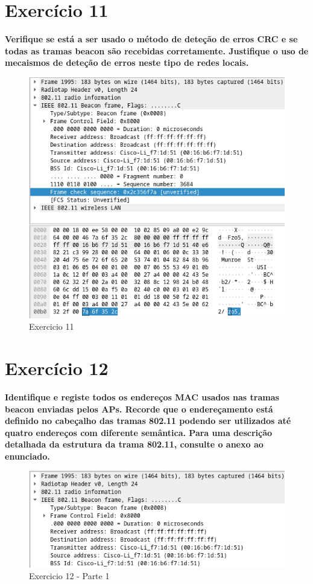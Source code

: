 \documentclass[a4paper]{report}
\begin{document}
\section{Exercício 11}
\textbf{Verifique se está a ser usado o método de deteção de erros CRC e se
    todas as tramas beacon são recebidas corretamente. Justifique o uso de
    mecaismos de deteção de erros neste tipo de redes locais.}

\begin{figure}[H]
    \centering 
    \includegraphics[width=\textwidth]{images/ex11.png}  
    \caption{Exercicio 11}
    \label{fig:ex11}
\end{figure}

\section{Exercício 12}
\textbf{Identifique e registe todos os endereços MAC usados nas tramas beacon
    enviadas pelos APs. Recorde que o endereçamento está definido no cabeçalho
    das tramas 802.11 podendo ser utilizados até quatro endereços com diferente
    semântica. Para uma descrição detalhada da estrutura da trama 802.11,
    consulte o anexo ao enunciado.}
\begin{figure}[H]
    \centering 
    \includegraphics[width=\textwidth]{images/ex12p1.png}  
    \caption{Exercicio 12 - Parte 1}
    \label{fig:ex12p1}
\end{figure}
\end{document}
